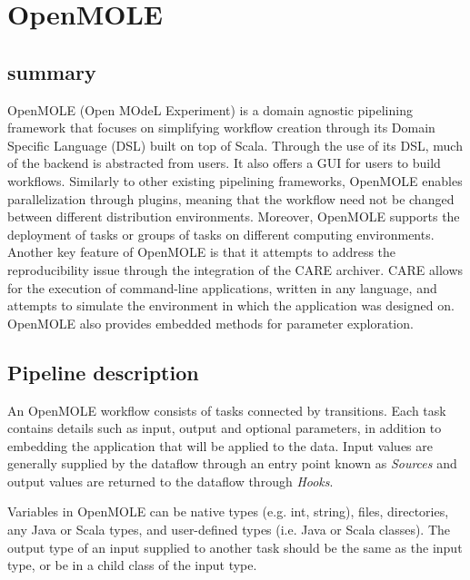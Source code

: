 \documentclass{report}
\begin{document}
         \section{OpenMOLE} \subsection{summary} OpenMOLE (Open MOdeL
         Experiment) is a domain agnostic pipelining framework that focuses on
         simplifying workflow creation through its Domain Specific Language
         (DSL) built on top of Scala. Through the use of its DSL, much of the
         backend is abstracted from users. It also offers a GUI for users to
         build workflows. Similarly to other existing pipelining frameworks,
         OpenMOLE enables parallelization through plugins, meaning that the
         workflow need not be changed between different distribution
         environments.  Moreover, OpenMOLE supports the deployment of tasks or
         groups of tasks on different computing environments.  Another key
         feature of OpenMOLE is that it attempts to address the reproducibility
         issue through the integration of the CARE archiver. CARE allows for the
         execution of command-line applications, written in any language, and
         attempts to simulate the environment in which the application was
         designed on.  OpenMOLE also provides embedded methods for parameter
         exploration.

        \subsection{Pipeline description} An OpenMOLE workflow consists of tasks
        connected by transitions. Each task contains details such as input,
        output and optional parameters, in addition to embedding the application
        that will be applied to the data. Input values are generally supplied by
        the dataflow through an entry point known as \textit{Sources} and output
        values are returned to the dataflow through \textit{Hooks}.   

      Variables in OpenMOLE can be native types (e.g. int, string), files,
      directories, any Java or Scala types, and user-defined types (i.e. Java or
      Scala classes). The output type of an input supplied to another task
      should be the same as the input type, or be in a child class of the input
      type.
\end{document}
